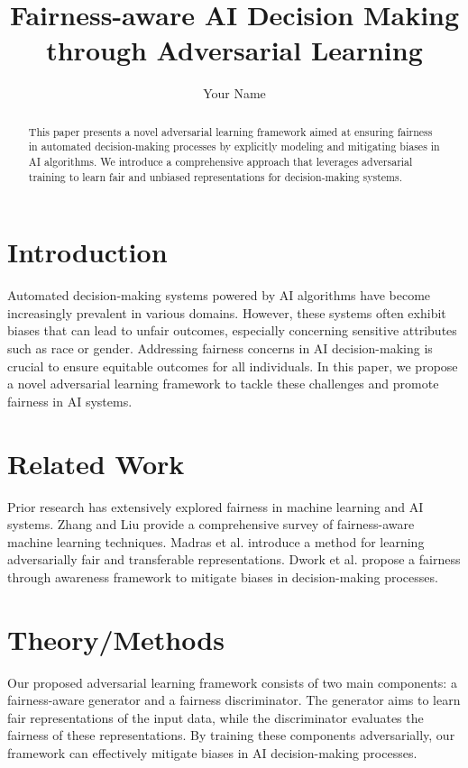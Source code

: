 \documentclass{article}
\title{Fairness-aware AI Decision Making through Adversarial Learning}
\author{Your Name}
\date{}
\begin{document}
\maketitle

\begin{abstract}
    This paper presents a novel adversarial learning framework aimed at ensuring fairness in automated decision-making processes by explicitly modeling and mitigating biases in AI algorithms. We introduce a comprehensive approach that leverages adversarial training to learn fair and unbiased representations for decision-making systems.
\end{abstract}

\section{Introduction}
Automated decision-making systems powered by AI algorithms have become increasingly prevalent in various domains. However, these systems often exhibit biases that can lead to unfair outcomes, especially concerning sensitive attributes such as race or gender. Addressing fairness concerns in AI decision-making is crucial to ensure equitable outcomes for all individuals. In this paper, we propose a novel adversarial learning framework to tackle these challenges and promote fairness in AI systems.

\section{Related Work}
Prior research has extensively explored fairness in machine learning and AI systems. Zhang and Liu \cite{Zhang2022} provide a comprehensive survey of fairness-aware machine learning techniques. Madras et al. \cite{Madras2018} introduce a method for learning adversarially fair and transferable representations. Dwork et al. \cite{Dwork2012} propose a fairness through awareness framework to mitigate biases in decision-making processes.

\section{Theory/Methods}
Our proposed adversarial learning framework consists of two main components: a fairness-aware generator and a fairness discriminator. The generator aims to learn fair representations of the input data, while the discriminator evaluates the fairness of these representations. By training these components adversarially, our framework can effectively mitigate biases in AI decision-making processes.
\end{document}
